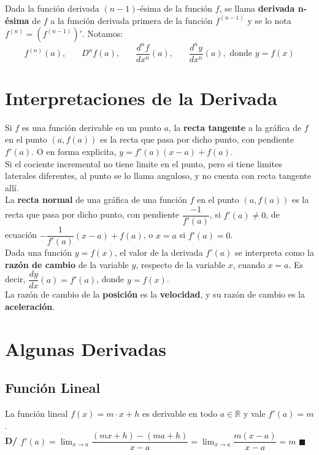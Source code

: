 \documentclass[11pt,a4paper]{article}
\newcommand*{\QEDA}{\null\nobreak\hfill\ensuremath{\blacksquare}}
\begin{document}
\noindent Dada la funci\'on derivada $(n-1)$-\'esima de la funci\'on $f$, se llama \textbf{derivada n-\'esima} de $f$ a la funci\'on derivada primera de la funci\'on $f^{(n-1)}$ y se lo nota $f^{(n)} = \left(f^{(n-1)}\right)'$. Notamos:
$$f^{(n)}(a),\ \ \ \ \ \ \ \ D^nf(a),\ \ \ \ \ \ \ \ \dfrac{d^nf}{dx^n}(a),\ \ \ \ \ \ \ \ \dfrac{d^ny}{dx^n}(a), \text{ donde $y=f(x)$}$$

\section{Interpretaciones de la Derivada}
\noindent Si $f$ es una funci\'on derivable en un punto $a$, la \textbf{recta tangente} a la gr\'afica de $f$ en el punto $(a,f(a))$ es la recta que pasa por dicho punto, con pendiente $f'(a)$. O en forma explicita, $y = f'(a)(x-a)+f(a)$.\\

\noindent Si el cociente incremental no tiene limite en el punto, pero si tiene limites laterales diferentes, al punto se lo llama anguloso, y no cuenta con recta tangente all\'i.\\

\noindent La \textbf{recta normal} de una gr\'afica de una funci\'on $f$ en el punto $(a,f(a))$ es la recta que pasa por dicho punto, con pendiente $\dfrac{-1}{f'(a)}$, si $f'(a)\not=0$, de ecuaci\'on $-\dfrac{1}{f'(a)}(x-a)+f(a)$, o $x=a$ si $f'(a)=0$.\\

\noindent Dada una funci\'on $y=f(x)$, el valor de la derivada $f'(a)$ se interpreta como la \textbf{raz\'on de cambio} de la variable $y$, respecto de la variable $x$, cuando $x=a$. Es decir, $\dfrac{dy}{dx}(a) = f'(a)$, donde $y=f(x)$.\\
\noindent La raz\'on de cambio de la \textbf{posici\'on} es la \textbf{velocidad}, y su raz\'on de cambio es la \textbf{aceleraci\'on}.


\section{Algunas Derivadas}
\subsection{Funci\'on Lineal}
\noindent La funci\'on lineal $f(x) = m\cdot x + h$ es derivable en todo $a\in\mathbb{R}$ y vale $f'(a)=m$.\\
\textbf{D/} $\displaystyle{f'(a) = \lim_{x \to a} \dfrac{(mx+h)-(ma+h)}{x-a} = \lim_{x \to a} \dfrac{m(x-a)}{x-a}=m }$ \QEDA
\end{document}
